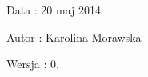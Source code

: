 \begin{DoxyDate}{Data}
\-: 20 maj 2014 
\end{DoxyDate}
\begin{DoxyAuthor}{Autor}
\-: Karolina Morawska 
\end{DoxyAuthor}
\begin{DoxyVersion}{Wersja}
\-: 0. 
\end{DoxyVersion}
